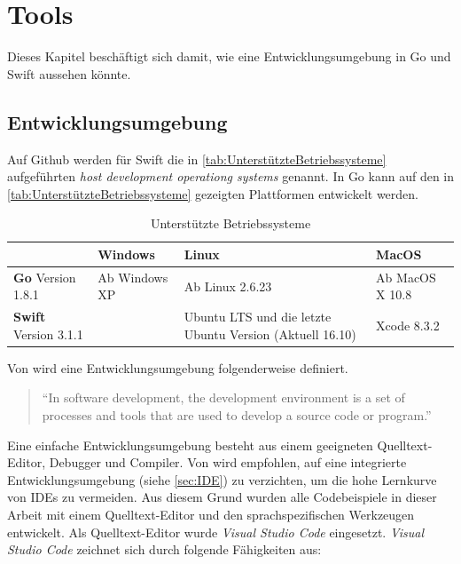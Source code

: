 \chapter{Tools}
Dieses Kapitel beschäftigt sich damit, wie eine Entwicklungsumgebung in Go und Swift aussehen könnte. 


\section{Entwicklungsumgebung}
Auf Github \cite[]{Github.Swift} werden für Swift die in \autoref{tab:UnterstützteBetriebssysteme} aufgeführten \textit{host development operationg systems} genannt.
In Go kann auf den in \autoref{tab:UnterstützteBetriebssysteme} gezeigten Plattformen entwickelt werden.

\begin{table}[H]
    \centering
    \begin{tabularx}{\textwidth}{ |X|X|X|X| }
    \hline 
    \rowcolor[gray]{0.75} \cellcolor{white} & \textbf{Windows} & \textbf{Linux} & \textbf{MacOS} \\
    \hline
    \cellcolor{Gray} \textbf{Go} Version 1.8.1 & Ab Windows XP & Ab Linux 2.6.23 & Ab MacOS X 10.8 \\
    \hline
    \cellcolor{Gray} \textbf{Swift} Version 3.1.1 &  & Ubuntu LTS und die letzte Ubuntu Version (Aktuell 16.10) & Xcode 8.3.2 \\
    \hline
    \end{tabularx}
    \caption{Unterstützte Betriebssysteme}
    \label{tab:UnterstützteBetriebssysteme}
\end{table}

Von \cite[]{TechnoPedia} wird eine Entwicklungsumgebung folgenderweise definiert.

\begin{quote}
\enquote{In software development, the development environment is a set of processes and tools that are used to develop a source code or program.}\cite[]{TechnoPedia}
\end{quote}

Eine einfache Entwicklungsumgebung besteht aus einem geeigneten Quelltext-Editor, Debugger und Compiler. Von \cite[]{NotUseIde} wird empfohlen, auf eine integrierte Entwicklungsumgebung (siehe \autoref{sec:IDE}) zu verzichten, um die hohe Lernkurve von \gls{IDE}s zu vermeiden.
Aus diesem Grund wurden alle Codebeispiele in dieser Arbeit mit einem Quelltext-Editor und den sprachspezifischen Werkzeugen entwickelt.
Als Quelltext-Editor wurde \textit{Visual Studio Code} eingesetzt. 
\textit{Visual Studio Code} zeichnet sich durch folgende Fähigkeiten aus:

